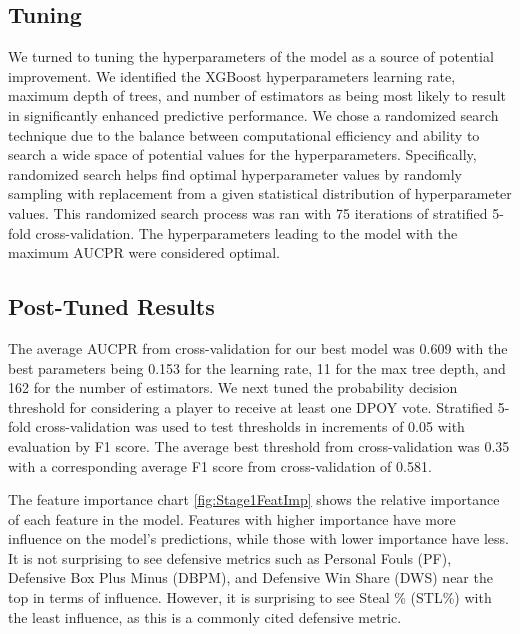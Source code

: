 \documentclass[letterpaper,titlepage]{article}
\begin{document}
    \subsection{Tuning}
    We turned to tuning the hyperparameters of the model as a source of potential improvement. We identified the XGBoost hyperparameters learning rate, maximum depth of trees, and number of estimators as being most likely to result in significantly enhanced predictive performance. We chose a randomized search technique due to the balance between computational efficiency and ability to search a wide space of potential values for the hyperparameters. Specifically, randomized search helps find optimal hyperparameter values by randomly sampling with replacement from a given statistical distribution of hyperparameter values. This randomized search process was ran with 75 iterations of stratified 5-fold cross-validation. The hyperparameters leading to the model with the maximum AUCPR were considered optimal.

    \subsection{Post-Tuned Results}
    The average AUCPR from cross-validation for our best model was 0.609 with the best parameters being 0.153 for the learning rate, 11 for the max tree depth, and 162 for the number of estimators. We next tuned the probability decision threshold for considering a player to receive at least one DPOY vote. Stratified 5-fold cross-validation was used to test thresholds in increments of 0.05 with evaluation by F1 score. The average best threshold from cross-validation was 0.35 with a corresponding average F1 score from cross-validation of 0.581.

    The feature importance chart \autoref{fig:Stage1FeatImp} shows the relative importance of each feature in the model. Features with higher importance have more influence on the model's predictions, while those with lower importance have less. It is not surprising to see defensive metrics such as Personal Fouls (PF), Defensive Box Plus Minus (DBPM), and Defensive Win Share (DWS) near the top in terms of influence. However, it is surprising to see Steal \% (STL\%) with the least influence, as this is a commonly cited defensive metric.
\end{document}

